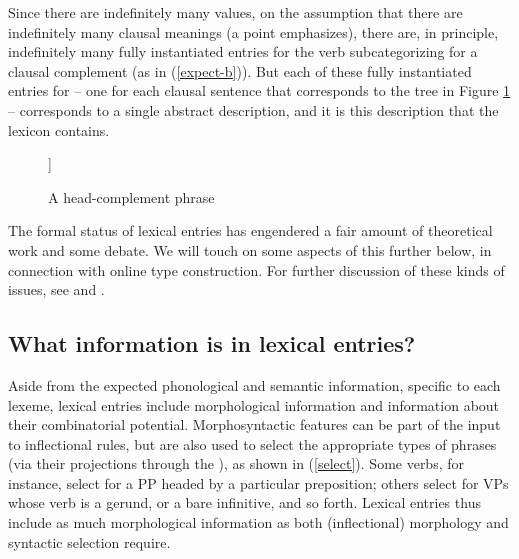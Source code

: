 \documentclass[output=paper]{langsci/langscibook}
\begin{document}
Since there are indefinitely many  values, on the assumption that there are indefinitely many clausal meanings (a point \citet[p. 8--9]{Jackendoff1990} emphasizes), there are, in principle, indefinitely many fully instantiated entries for the verb  subcategorizing for a clausal complement (as in (\ref{expect-b})). 
But each of these fully instantiated entries for  -- one for each clausal sentence that corresponds to the tree in Figure \ref{expect-b-tree} -- corresponds to a single abstract description, and it is this description that the lexicon contains. 

\begin{figure}[htbp!]
	\begin{forest}
	[ [{\begin{avm}\[comps & \< \@1 \>\]\end{avm}} ] 
	[{\begin{avm}\[synsem & \@1 \]\end{avm}} ] ]
\end{forest}	
\caption{\label{expect-b-tree} A head-complement phrase}
\end{figure}  


The formal status of lexical entries has engendered a fair amount of theoretical work and some debate.
We will touch on some aspects of this further below, in connection with online type construction.
For further discussion of these kinds of issues, see  and .

\subsection{What information is in lexical entries?}

Aside from the expected phonological and semantic information, specific to each lexeme, lexical entries include morphological information and information about their combinatorial potential. Morphosyntactic features can be part of the input to inflectional rules, but are also used to select the appropriate types of phrases (via their projections through the ), as shown in (\ref{select}). Some verbs, for instance, select for a PP headed by a particular preposition; others select for VPs whose verb is a gerund, or a bare infinitive, and so forth. Lexical entries thus include as much morphological information as both (inflectional) morphology and syntactic selection require.
\end{document}
